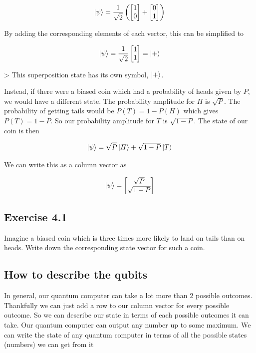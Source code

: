 \documentclass{book}
\begin{document}
$$ \ket{\psi} = \frac{1}{\sqrt{2}}\left(\begin{bmatrix}
1 \\ 0
\end{bmatrix}+ \begin{bmatrix}
0 \\ 1
\end{bmatrix}\right) $$

By adding the corresponding elements of each vector, this can be simplified to

$$ \ket{\psi} = \frac{1}{\sqrt{2}}\begin{bmatrix} 1 \\ 1 \end{bmatrix} = \ket{+}$$

> This superposition state has its own symbol, $\ket{+}$.

Instead, if there were a biased coin which had a probability of heads given by $P$, we would have a different state. The probability amplitude for $H$ is $\sqrt{P}$. The probability of getting tails would be $ P(T) = 1 - P(H)$ which gives $P(T) = 1 -P$. So our probability amplitude for $T$ is $\sqrt{1 - P}$. The state of our coin is then 

$$
\ket{\psi} = \sqrt{P}\ket{H} + \sqrt{1-P}\ket{T}
$$

We can write this as a column vector as

$$
\ket{\psi} = \begin{bmatrix}
\sqrt{P} \\ \sqrt{1-P}
\end{bmatrix}
$$



\subsection{Exercise 4.1 }

Imagine a biased coin which is three times more likely to land on tails than on heads. Write down the corresponding state vector for such a coin.


\subsection{How to describe the qubits}

In general, our quantum computer can take a lot more than 2 possible outcomes. Thankfully we can just add a row to our column vector for every possible outcome. So we can describe our state in terms of each possible outcomes it can take. Our quantum computer can output any number up to some maximum.  We can write the state of any quantum computer in terms of all the possible states (numbers) we can get from it
\end{document}

